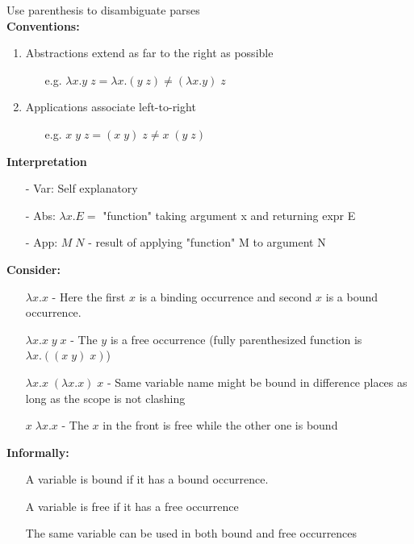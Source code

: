 \documentclass[11pt]{article}
\begin{document}
Use parenthesis to disambiguate parses \\

\textbf{Conventions:}
\begin{enumerate}
\item Abstractions extend as far to the right as possible
	\begin{itemize}
		\item[e.g.] $\lambda x.y\;z = \lambda x.(y\;z) \neq (\lambda x.y)\;z$
	\end{itemize}
\item Applications associate left-to-right
	\begin{itemize}
		\item[e.g.] $x\;y\;z = (x\;y)\;z \neq x\;(y\;z)$
	\end{itemize}
\end{enumerate}

\textbf{Interpretation}
	\begin{itemize}
		\item[-] Var: Self explanatory
		\item[-] Abs: $\lambda x.E =$ "function" taking argument x and returning expr E
		\item[-] App: $M\;N$ - result of applying "function" M to argument N
	\end{itemize}

\textbf{Consider:}
\begin{itemize}
\item[] $\lambda x.x$ - Here the first $x$ is a binding occurrence and second $x$ is a bound occurrence.
\item[] $\lambda x.x\;y\;x$ - The $y$ is a free occurrence (fully parenthesized function is $\lambda x.((x\;y)\;x)$)
\item[] $\lambda x.x\;(\lambda x.x)\;x$ - Same variable name might be bound in difference places as long as the scope is not clashing
\item[] $x\;\lambda x.x$ - The $x$ in the front is free while the other one is bound
\end{itemize}

\textbf{Informally:}
\begin{itemize}
\item[] A variable is bound if it has a bound occurrence.
\item[] A variable is free if it has a free occurrence
\item[] The same variable can be used in both bound and free occurrences
\end{itemize}
\end{document}
